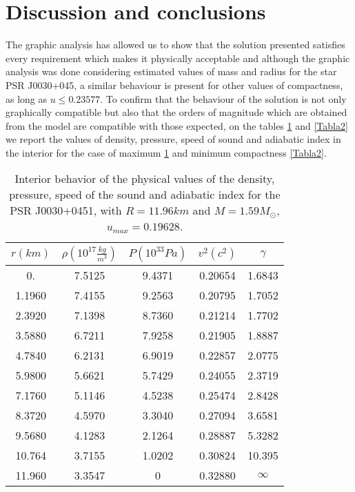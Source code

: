 \documentclass[12pt,onecolumn,a4paper]{article}
\begin{document}
\section{Discussion and conclusions}
\label{seccion5}
The graphic analysis has allowed us to show that the solution presented satisfies every requirement which makes it physically acceptable and although the graphic analysis was done considering estimated values of mass and radius for the star PSR J0030+045, a similar behaviour is present for other values of compactness, as long as $u\leq 0.23577$. To confirm that the behaviour of the solution is not only graphically compatible but also that the orders of magnitude which are obtained from the model are compatible with those expected, on the tables \ref{Tabla1} and \ref{Tabla2} we report the values of density, pressure, speed of sound and adiabatic index in the interior for the case of maximum \ref{Tabla1} and minimum compactness \ref{Tabla2}. 
\begin{table}[h]
\caption{Interior behavior of the physical values of the density, pressure, speed of the sound and adiabatic index for the PSR  J0030+0451, with  $R=11.96 km$ and $M=1.59 M_\odot$, $u_{max} = 0.19628$.}
{ \begin{tabular}{|c|c|c|c|c|}
\hline
$r(km)$&$\!\!\rho\left(10^{17}\frac{kg}{m^3}\right)\!\!\!$&$\! P(10^{33} Pa)$ & $v^2(c^2)$& $\gamma$  \\ \hline 
     0.&  7.5125 &  9.4371 &  0.20654 &  1.6843  \\  \hline
1.1960 &  7.4155 &  9.2563 &  0.20795 &  1.7052   \\  \hline
2.3920 &  7.1398 &  8.7360 &  0.21214 &  1.7702   \\  \hline
3.5880 &  6.7211 &  7.9258 &  0.21905 &  1.8887   \\  \hline
4.7840 &  6.2131 &  6.9019 &  0.22857 &  2.0775   \\  \hline
5.9800 &  5.6621 &  5.7429 &  0.24055 &  2.3719   \\  \hline
7.1760 &  5.1146 &  4.5238 &  0.25474 &  2.8428   \\  \hline
8.3720 &  4.5970 &  3.3040 &  0.27094 &  3.6581   \\  \hline
9.5680 &  4.1283 &  2.1264 &  0.28887 &  5.3282   \\  \hline
10.764 &  3.7155 &  1.0202 &  0.30824 &  10.395   \\  \hline
11.960 &  3.3547 &       0 &  0.32880 & $\infty$  \\  \hline  
\end{tabular} }
\label{Tabla1}
\end{table}
\end{document}
